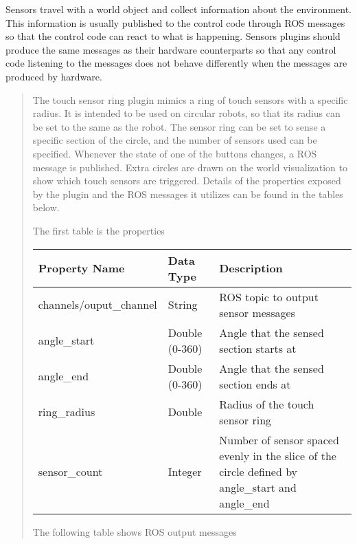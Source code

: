 \documentclass[letterpaper,10pt,english]{sphinxmanual}
\begin{document}

Sensors travel with a world object and collect information about the environment.
This information is usually published to the control code through ROS messages so
that the control code can react to what is happening. Sensors plugins should produce
the same messages as their hardware counterparts so that any control code listening to
the messages does not behave differently when the messages are produced by hardware.
\begin{quote}


The touch sensor ring plugin mimics a ring of touch sensors with a specific
radius. It is intended to be used on circular robots, so that its radius can
be set to the same as the robot. The sensor ring can be set to sense a specific
section of the circle, and the number of sensors used can be specified. Whenever
the state of one of the buttons changes, a ROS message is published. Extra
circles are drawn on the world visualization to show which touch sensors are
triggered. Details of the properties exposed by the plugin and the ROS messages
it utilizes can be found in the tables below.

The first table is the properties


\begin{savenotes}\sphinxattablestart
\centering
\begin{tabulary}{\linewidth}[t]{|T|T|T|}
\hline
\sphinxstyletheadfamily 
Property Name
&\sphinxstyletheadfamily 
Data Type
&\sphinxstyletheadfamily 
Description
\\
\hline
channels/ouput\_channel
&
String
&
ROS topic to output sensor messages
\\
\hline
angle\_start
&
Double (0-360)
&
Angle that the sensed section starts at
\\
\hline
angle\_end
&
Double (0-360)
&
Angle that the sensed section ends at
\\
\hline
ring\_radius
&
Double
&
Radius of the touch sensor ring
\\
\hline
sensor\_count
&
Integer
&
Number of sensor spaced evenly in the slice of the circle defined by angle\_start and angle\_end
\\
\hline
\end{tabulary}
\par
\sphinxattableend\end{savenotes}

The following table shows ROS output messages



\end{quote}
\end{document}
